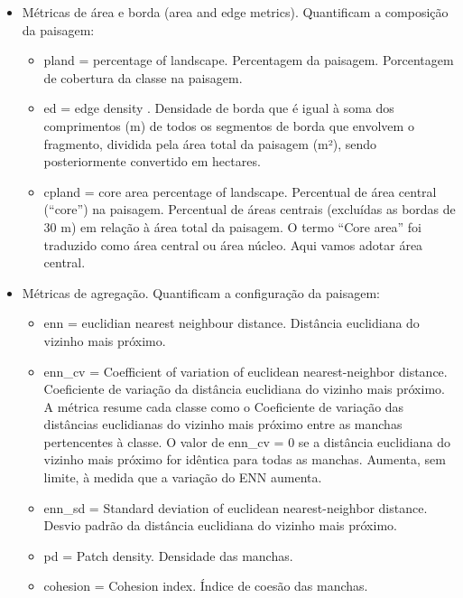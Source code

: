\documentclass[
]{article}
\providecommand{\tightlist}{%
  \setlength{\itemsep}{0pt}\setlength{\parskip}{0pt}}
\begin{document}
\begin{itemize}
\item
  Métricas de área e borda (area and edge metrics). Quantificam a composição da paisagem:

  \begin{itemize}
  \tightlist
  \item
    \colorbox[HTML]{dedede}{pland} = percentage of landscape. Percentagem da paisagem. Porcentagem de cobertura da classe na paisagem.
  \item
    \colorbox[HTML]{dedede}{ed} = edge density . Densidade de borda que é igual à soma dos comprimentos (m) de todos os segmentos de borda que envolvem o fragmento, dividida pela área total da paisagem (m²), sendo posteriormente convertido em hectares.
  \item
    \colorbox[HTML]{dedede}{cpland} = core area percentage of landscape. Percentual de área central (``core'') na paisagem.
    Percentual de áreas centrais (excluídas as bordas de 30 m) em relação à área total da paisagem. O termo ``Core area'' foi traduzido como área central ou área núcleo. Aqui vamos adotar área central.
  \end{itemize}
\item
  Métricas de agregação. Quantificam a configuração da paisagem:

  \begin{itemize}
  \tightlist
  \item
    \colorbox[HTML]{dedede}{enn} = euclidian nearest neighbour distance. Distância euclidiana do vizinho mais próximo.
  \item
    \colorbox[HTML]{dedede}{enn\_cv} = Coefficient of variation of euclidean nearest-neighbor distance. Coeficiente de variação da distância euclidiana do vizinho mais próximo. A métrica resume cada classe como o Coeficiente de variação das distâncias euclidianas do vizinho mais próximo entre as manchas pertencentes à classe. O valor de enn\_cv = 0 se a distância euclidiana do vizinho mais próximo for idêntica para todas as manchas. Aumenta, sem limite, à medida que a variação do ENN aumenta.
  \item
    \colorbox[HTML]{dedede}{enn\_sd} = Standard deviation of euclidean nearest-neighbor distance. Desvio padrão da distância euclidiana do vizinho mais próximo.
  \item
    \colorbox[HTML]{dedede}{pd} = Patch density. Densidade das manchas.
  \item
    \colorbox[HTML]{dedede}{cohesion} = Cohesion index. Índice de coesão das manchas.
  \end{itemize}
\end{itemize}
\end{document}
